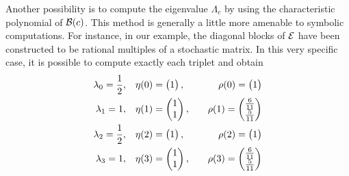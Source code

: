 \documentclass{article}
\begin{document}
Another possibility is to compute the eigenvalue $\Lambda _c$ by using the characteristic polynomial
of $\mathcal B(c)$. This method is generally a little more amenable to symbolic computations.
For instance, in our example, the diagonal blocks of $\mathcal{E}$ have been 
constructed to be rational multiples of a stochastic matrix. In this very specific case, it is possible to compute exactly
each triplet and obtain
%
\begin{equation} \begin{aligned}
 \lambda_{0} = \frac{1}{2},  \quad& \eta(0) = \begin{pmatrix}
1
\end{pmatrix}, \quad& \rho(0) = \begin{pmatrix}
1
\end{pmatrix} \\  \lambda_{1} = 1,  \quad& \eta(1) = \begin{pmatrix}
1\\
1
\end{pmatrix}, \quad& \rho(1) = \begin{pmatrix}
\frac{6}{11}\\
\frac{5}{11}
\end{pmatrix} \\  \lambda_{2} = \frac{1}{2},  \quad& \eta(2) = \begin{pmatrix}
1
\end{pmatrix}, \quad& \rho(2) = \begin{pmatrix}
1
\end{pmatrix} \\  \lambda_{3} = 1,  \quad& \eta(3) = \begin{pmatrix}
1\\
1
\end{pmatrix}, \quad& \rho(3) = \begin{pmatrix}
\frac{6}{11}\\
\frac{5}{11}
\end{pmatrix} \\ 
\end{aligned}\end{equation} 
\end{document}

